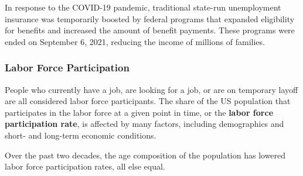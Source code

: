 \documentclass{report}
\begin{document}
{{\begin{minipage}{0.76\textwidth}
\small In response to the COVID-19 pandemic, traditional state-run unemployment insurance was temporarily boosted by federal programs that expanded eligibility for benefits and increased the amount of benefit payments. These programs were ended on September 6, 2021, reducing the income of millions of families. 

%

\end{minipage}
\newpage
\hypertarget{labp}{}
\begin{minipage}{0.76\textwidth}
\subsubsection*{Labor Force Participation}
\small People who currently have a job, are looking for a job, or are on temporary layoff are all considered labor force participants. The share of the US population that participates in the labor force at a given point in time, or the \textbf{labor force participation rate}, is affected by many factors, including demographics and short- and long-term economic conditions.

Over the past two decades, the age composition of the population has lowered labor force participation rates, all else equal. 


\vspace{2mm}


\end{minipage}}}
\end{document}
